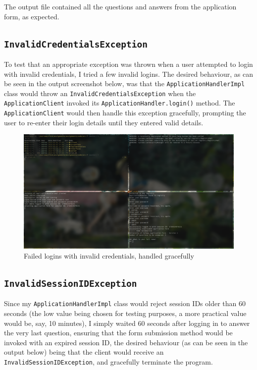 \documentclass[a4paper]{article}
\begin{document}
The output file contained all the questions and answers from the application form, as expected.

\subsection{\texttt{InvalidCredentialsException}}
To test that an appropriate exception was thrown when a user attempted to login with invalid credentials, I tried a few invalid logins.
The desired behaviour, as can be seen in the output screenshot below, was that the \texttt{ApplicationHandlerImpl} class would throw an \texttt{InvalidCredentialsException} when the \texttt{ApplicationClient} invoked its \texttt{ApplicationHandler.login()} method.
The \texttt{ApplicationClient} would then handle this exception gracefully, prompting the user to re-enter their login details until they entered valid details.

\begin{figure}[H]
    \centering
    \includegraphics[width=\textwidth]{./images/inalidcred.png}
    \caption{Failed logins with invalid credentials, handled gracefully }
\end{figure}

\subsection{\texttt{InvalidSessionIDException}}
Since my \texttt{ApplicationHandlerImpl} class would reject session IDs older than 60 seconds (the low value being chosen for testing purposes, a more practical value would be, say, 10 minutes), I simply waited 60 seconds after logging in to answer the very last question, ensuring that the form submission method would be invoked with an expired session ID, the desired behaviour (as can be seen in the output below) being that the client would receive an \texttt{InvalidSessionIDException}, and gracefully terminate the program.
\end{document}
